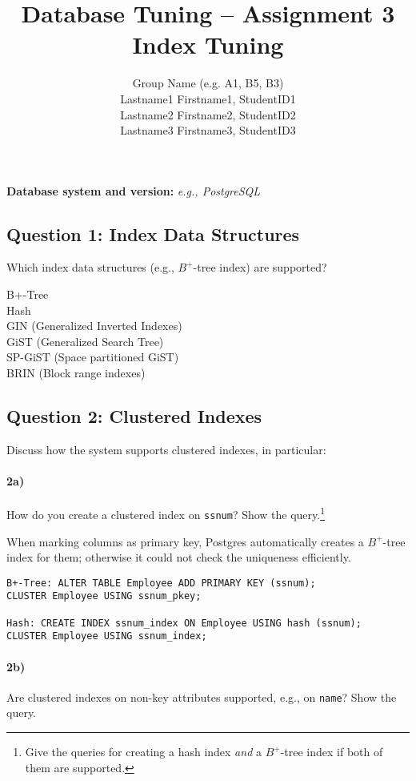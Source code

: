 \documentclass[11pt]{scrartcl}
\title{
  \textbf{\large Database Tuning -- Assignment 3}\\
  Index Tuning
}
\author{
 Group Name (e.g. A1, B5, B3)\\
 \large Lastname1 Firstname1, StudentID1 \\
 \large Lastname2 Firstname2, StudentID2 \\
 \large Lastname3 Firstname3, StudentID3 
}
\begin{document}
\maketitle

\medskip

\noindent\textbf{Database system and version:} {\it e.g., PostgreSQL}

\subsection*{Question 1: Index Data Structures} Which index data structures (e.g., $B^+$-tree
index) are supported?

\vspace{1em}
B+-Tree\\
Hash\\
GIN (Generalized Inverted Indexes)\\
GiST (Generalized Search Tree)\\
SP-GiST (Space partitioned GiST)\\
BRIN (Block range indexes)

\subsection*{Question 2: Clustered Indexes} Discuss how the system
supports clustered indexes, in particular:

\paragraph{2a)} How do you create a clustered index on {\tt ssnum}?
Show the query.\footnote{Give the queries for creating a hash index
  \emph{and} a $B^+$-tree index if both of them are supported.}

\vspace{1em}
When marking columns as primary key, Postgres automatically creates
a $B^+$-tree index for them; otherwise it could not check the uniqueness
efficiently.

{\small
\begin{verbatim}
B+-Tree: ALTER TABLE Employee ADD PRIMARY KEY (ssnum);
CLUSTER Employee USING ssnum_pkey;

Hash: CREATE INDEX ssnum_index ON Employee USING hash (ssnum);
CLUSTER Employee USING ssnum_index;
\end{verbatim}
}

\paragraph{2b)} Are clustered indexes on non-key attributes supported, e.g.,
on {\tt name}?  Show the query.
\end{document}
